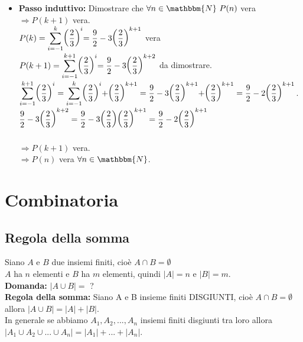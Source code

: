 \documentclass[12pt, letterpaper]{report}
\begin{document}
\begin{enumerate}
\begin{itemize}
  				Sono uguali quindi $P(0)$ vera.
  				\item \textbf{Passo induttivo:} Dimostrare che $\forall n \in \mathbbm{N} \ P(n)$ vera $\Rightarrow P(k + 1)$ vera. \\
  				$P(k) = \mathlarger{\sum_{i = -1}^{k}\biggl(\frac{2}{3}\biggl)^i = \frac{9}{2} - 3\biggl(\frac{2}{3}\biggl)^{k+1}}$ vera\\
  				$P(k+1) = \mathlarger{\sum_{i = -1}^{k+1}\biggl(\frac{2}{3}\biggl)^i = \frac{9}{2} - 3\biggl(\frac{2}{3}\biggl)^{k+2}}$ da dimostrare.\\
  				$\mathlarger{\sum_{i = -1}^{k+1}\biggl(\frac{2}{3}\biggl)^i} = \mathlarger{\sum_{i=-1}^{k}\biggl(\frac{2}{3}\biggl)^i + \biggl(\frac{2}{3}\biggl)^{k + 1}} = \mathlarger{\frac{9}{2} - 3\biggl(\frac{2}{3}\biggl)^{k+1} + \biggl(\frac{2}{3}\biggl)^{k + 1}} = \mathlarger{\frac{9}{2} - 2\biggl(\frac{2}{3}\biggl)^{k+1}}$. \\
  				$\mathlarger{\frac{9}{2} - 3\biggl(\frac{2}{3}\biggl)^{k + 2}} = \mathlarger{\frac{9}{2} - 3\biggl(\frac{2}{3}\biggl)\biggl(\frac{2}{3}\biggl)^{k + 1}} = \mathlarger{\frac{9}{2} - 2\biggl(\frac{2}{3}\biggl)^{k + 1}}$ \\ \\
  				$\Rightarrow P(k + 1)$ vera. \\
  				$\Rightarrow P(n)$ vera $\forall n \in \mathbbm{N}$.
  			\end{itemize}
  		\end{enumerate}

  		\chapter{Combinatoria}
  		\section{Regola della somma}
  		Siano $A$ e $B$ due insiemi finiti, cioè $A \cap B = \emptyset$ \\
  		$A$ ha $n$ elementi e $B$ ha $m$ elementi, quindi $|A| = n$ e $|B| = m$. \\
  		\textbf{Domanda:} $|A \cup B|= $ ?
  		\\
  		\textbf{Regola della somma:} Siano A e B insieme finiti DISGIUNTI, cioè $A \cap B = \emptyset$ allora $|A \cup B| = |A| + |B|$.\\
  		In generale se abbiamo $A_1, A_2, ..., A_n$ insiemi finiti disgiunti tra loro allora $|A_1 \cup A_2 \cup ... \cup A_n|=|A_1|+ ... + |A_n|$. \\
\end{document}
